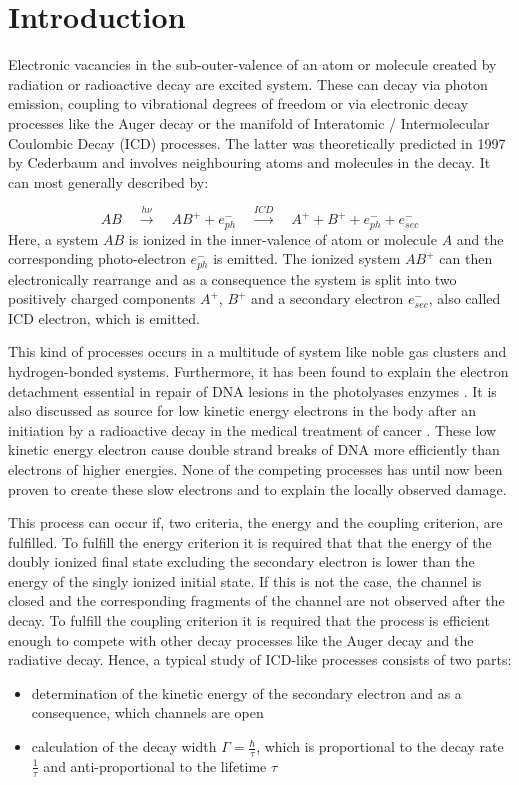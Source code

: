 \chapter{Introduction}
Electronic vacancies in the sub-outer-valence of an atom or molecule
created by radiation or radioactive decay are excited system.
These can decay via photon emission, coupling to vibrational degrees
of freedom or via electronic decay processes like the Auger
decay \cite{Meitner22,Auger23} or the
manifold of Interatomic / Intermolecular Coulombic Decay (ICD) processes.
The latter was theoretically predicted in 1997 by Cederbaum and involves
neighbouring atoms and molecules in the decay.
It can most generally described by:

\begin{equation*}
 AB \quad \xrightarrow{h\nu}\quad AB^+ + e^-_{ph} \quad
    \xrightarrow{ICD} \quad A^+ + B^+ + e^-_{ph} + e^-_{sec}
\end{equation*}
Here, a system $AB$ is ionized in the inner-valence of atom or molecule $A$
and the corresponding
photo-electron $e^-_{ph}$ is emitted. The ionized system $AB^+$
can then electronically
rearrange and as a consequence the system is split into two positively
charged components $A^+$, $B^+$ and a secondary electron $e^-_{sec}$,
also called ICD electron, which is emitted.

This kind of processes occurs in a multitude of system like noble gas clusters
and hydrogen-bonded systems. Furthermore, it has been found to explain
the electron detachment essential in repair of DNA lesions in the
photolyases enzymes \cite{Harbach13}. It is also discussed as
source for low kinetic energy electrons in the body after an initiation
by a radioactive decay in the medical treatment of cancer
\cite{Kim11, Hergenhahn12, Boudaiffa00, Pan03, Martin04}. These low kinetic
energy electron cause
double strand breaks of DNA more efficiently than electrons of higher energies.
None of the competing processes has until now been proven to create these slow
electrons and to explain the locally observed damage.

This process can occur if,
two criteria, the energy and the coupling criterion,
are fulfilled. To fulfill the energy criterion it is required that
that the energy of the doubly ionized final state excluding the secondary
electron is lower than
the energy of the singly ionized initial state. If this is not the case, the
channel is closed and the corresponding fragments of the
channel are not observed after the decay.
To fulfill the coupling criterion it is required that the process
is efficient enough to compete
with other decay processes like the Auger decay
and the radiative decay.
Hence, a typical study of \ac{ICD}-like processes consists of two parts:
\begin{itemize}
 \item determination of the kinetic energy of the secondary electron
       and as a consequence, which channels are open
 \item calculation of the decay width $\Gamma=\frac{\hbar}{\tau}$, which
       is proportional to the decay rate $\frac{1}{\tau}$ and
       anti-proportional to the lifetime $\tau$
\end{itemize}

